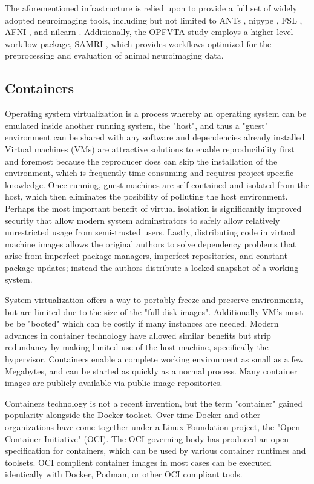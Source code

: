 The aforementioned infrastructure is relied upon to provide a full set of widely adopted neuroimaging tools, including but not limited to ANTs \cite{ants}, nipype \cite{nipype}, FSL \cite{fsl}, AFNI \cite{afni}, and nilearn \cite{nilearn}.
Additionally, the OPFVTA study employs a higher-level workflow package, SAMRI \cite{samri,irsabi}, which provides workflows optimized for the preprocessing and evaluation of animal neuroimaging data.


\subsection{Containers}

Operating system virtualization is a process whereby an operating system can be emulated inside another running system, the "host", and thus a "guest" environment can be shared with any software and dependencies already installed.
Virtual machines (VMs) are attractive solutions to enable reproducibility first and foremost because the reproducer does can skip the installation of the environment, which is frequently time consuming and requires project-specific knowledge.
Once running, guest machines are self-contained and isolated from the host, which then eliminates the posibility of polluting the host environment.
Perhaps the most important benefit of virtual isolation is significantly improved security that allow modern system adminstrators to safely allow relatively unrestricted usage from semi-trusted users.
Lastly, distributing code in virtual machine images allows the original authors to solve dependency problems that arise from imperfect package managers, imperfect repositories, and constant package updates; instead the authors distribute a locked snapshot of a working system.

System virtualization offers a way to portably freeze and preserve environments, but are limited due to the size of the "full disk images".
Additionally VM's must be be "booted" which can be costly if many instances are needed.
Modern advances in container technology have allowed similar benefits but strip redundancy by making limited use of the host machine, specifically the hypervisor.
Containers enable a complete working environment as small as a few Megabytes, and can be started as quickly as a normal process.
Many container images are publicly available via public image repositories.

Containers technology is not a recent invention, but the term "container" gained popularity alongside the Docker toolset.
Over time Docker and other organizations have come together under a Linux Foundation project, the "Open Container Initiative" (OCI).
The OCI governing body has produced an open specification for containers, which can be used by various container runtimes and toolsets.
OCI complient container images in most cases can be executed identically with Docker, Podman, or other OCI compliant tools.

